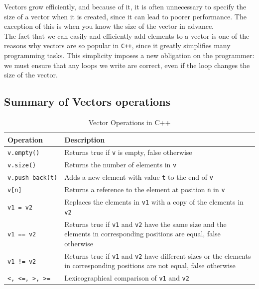 Vectors grow efficiently, and because of it, it is often unnecessary to specify the size of a vector when it is created,
since it can lead to poorer performance. The exception of this is when you know the size of the vector in advance.\\

The fact that we can easily and efficiently add elements to a vector is one of the reasons why vectors are so popular in
\texttt{C++}, since it greatly simplifies many programming tasks. This simplicity imposes a new obligation on the programmer:
we must ensure that any loops we write are correct, even if the loop changes the size of the vector.\\

\subsection{Summary of Vectors operations}

\begin{table}[ht]
\centering
\begin{tabular}{|l|p{7cm}|}
\hline
\textbf{Operation} & \textbf{Description} \\
\hline
\texttt{v.empty()} & Returns true if \texttt{v} is empty, false otherwise \\
\hline
\texttt{v.size()} & Returns the number of elements in \texttt{v} \\
\hline
\texttt{v.push\_back(t)} & Adds a new element with value \texttt{t} to the end of \texttt{v} \\
\hline
\texttt{v[n]} & Returns a reference to the element at position \texttt{n} in \texttt{v} \\
\hline
\texttt{v1 = v2} & Replaces the elements in \texttt{v1} with a copy of the elements in \texttt{v2} \\
\hline
\texttt{v1 == v2} & Returns true if \texttt{v1} and \texttt{v2} have the same size and the elements in corresponding positions are equal, false otherwise \\
\hline
\texttt{v1 != v2} & Returns true if \texttt{v1} and \texttt{v2} have different sizes or the elements in corresponding positions are not equal, false otherwise \\
\hline
\texttt{<, <=, >, >=} & Lexicographical comparison of \texttt{v1} and \texttt{v2} \\
\hline
\end{tabular}
\caption{Vector Operations in C++}
\label{tab:vector_operations}
\end{table}





